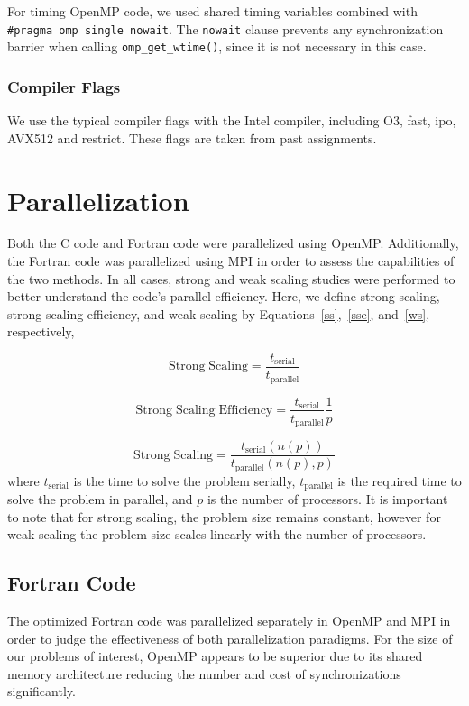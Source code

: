 \documentclass{scrartcl}
\begin{document}
For timing OpenMP code, we used shared timing variables combined with \texttt{\#pragma omp single nowait}. The \texttt{nowait} clause prevents any synchronization barrier when calling \texttt{omp\_get\_wtime()}, since it is not necessary in this case.
          
          \subsubsection{Compiler Flags}
          We use the typical compiler flags with the Intel compiler, including O3, fast, ipo, AVX512 and restrict. These flags are taken from past assignments.
       

  
  \section{Parallelization}
  Both the C code and Fortran code were parallelized using OpenMP. Additionally, the Fortran code was parallelized using MPI in order to assess the capabilities of the two methods. In all cases, strong and weak scaling studies were performed to better understand the code's parallel efficiency. Here, we define strong scaling, strong scaling efficiency, and weak scaling by Equations~\ref{ss},~\ref{sse}, and~\ref{ws}, respectively,
  
  \begin{equation}
  \mathrm{Strong\;Scaling} = \frac{t_{\mathrm{serial}}}{t_{\mathrm{parallel}}}
  \label{ss}
  \end{equation}
  
   \begin{equation}
  \mathrm{Strong\;Scaling\;Efficiency} = \frac{t_{\mathrm{serial}}}{t_{\mathrm{parallel}}} \frac{1}{p}    
   \label{sse}
   \end{equation}
    
    \begin{equation}
      \mathrm{Strong\;Scaling} = \frac{t_{\mathrm{serial}}(n(p))}{t_{\mathrm{parallel}}(n(p),p)}  
    \label{ws}
    \end{equation}
	 where $t_{\mathrm{serial}}$ is the time to solve the problem serially, $t_{\mathrm{parallel}}$ is the required time to solve the problem in parallel, and $p$ is the number of processors. It is important to note that for strong scaling, the problem size remains constant, however for weak scaling the problem size scales linearly with the number of processors.
  
  \subsection{Fortran Code}    
  The optimized Fortran code was parallelized separately in OpenMP and MPI in order to judge the effectiveness of both parallelization paradigms. For the size of our problems of interest, OpenMP appears to be superior due to its shared memory architecture reducing the number and cost of synchronizations significantly.
\end{document}
